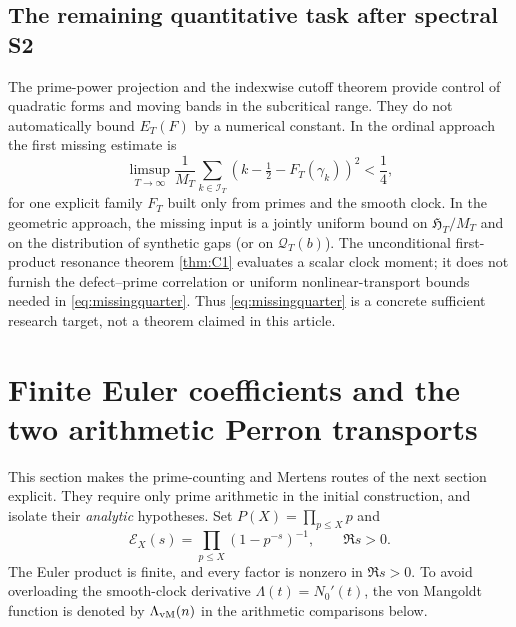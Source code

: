 \documentclass[11pt,reqno]{amsart}
\numberwithin{equation}{section}
\begin{document}
\subsection{The remaining quantitative task after spectral S2}
\label{subsec:blockbridge}
The prime-power projection and the indexwise cutoff theorem provide
control of quadratic forms and moving bands in the subcritical range.
They do not automatically bound $E_T(F)$ by a numerical constant.
In the ordinal approach the first missing estimate is
\begin{equation}\label{eq:missingquarter}
 \limsup_{T\to\infty}\frac1{M_T}
 \sum_{k\in\mathcal I_T}
 \left(k-\tfrac12-F_T(\gamma_k)\right)^2<\frac14,
\end{equation}
for one explicit family $F_T$ built only from primes and the smooth
clock.  In the geometric approach, the missing input is a jointly
uniform bound on $\mathfrak H_T/M_T$ and on the distribution of
synthetic gaps (or on $\mathcal Q_T(b)$). The unconditional
first-product resonance theorem \cref{thm:C1} evaluates a scalar
clock moment; it does not furnish the defect--prime correlation or
uniform nonlinear-transport bounds needed in \eqref{eq:missingquarter}.
Thus \eqref{eq:missingquarter} is a concrete sufficient research target,
not a theorem claimed in this article.


\section{Finite Euler coefficients and the two arithmetic Perron transports}
\label{sec:finiteeulertransports}

This section makes the prime-counting and Mertens routes of the
next section explicit.  They require only prime arithmetic in the
initial construction, and isolate their \emph{analytic} hypotheses.
Set $P(X)=\prod_{p\le X}p$ and
\begin{equation}\label{eq:EulerFixed}
 \mathscr E_X(s)=\prod_{p\le X}(1-p^{-s})^{-1},\qquad \Re s>0.
\end{equation}
The Euler product is finite, and every factor is nonzero in
$\Re s>0$.  To avoid overloading the smooth-clock derivative
$\Lambda(t)=N_0'(t)$, the von Mangoldt function is denoted by
$\Lambda_{\rm vM}(n)$ in the arithmetic comparisons below.
\end{document}
